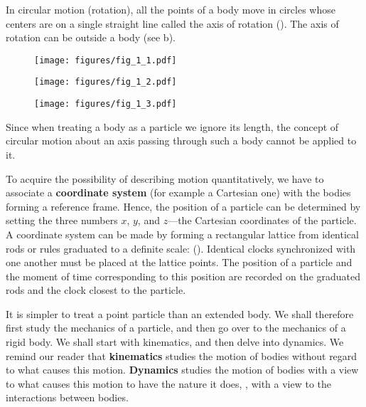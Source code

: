 In circular motion (rotation), all the points of a body move in circles whose centers are on a single straight line called the axis of rotation (). The axis of rotation can be outside a body (see b).

\begin{figure}[t]
	\begin{minipage}[t]{0.5\linewidth}
		\begin{center}
			\texttt{[image: figures/fig\_1\_1.pdf]}
			\caption[]{}
			\label{fig:1_1}
		\end{center}
	\end{minipage}
	\hfill{ }%
	\begin{minipage}[t]{0.5\linewidth}
		\begin{center}
			\texttt{[image: figures/fig\_1\_2.pdf]}
			\caption[]{}
			\label{fig:1_2}
		\end{center}
	\end{minipage}
\end{figure}

\begin{figure}[t]
	\begin{center}
		\texttt{[image: figures/fig\_1\_3.pdf]}
		\caption[]{}
		\label{fig:1_3}
	\end{center}
	\vspace{-0.8cm}
\end{figure}

Since when treating a body as a particle we ignore its length, the concept of circular motion about an axis passing through such a body cannot be applied to it.

To acquire the possibility of describing motion quantitatively, we have to associate a \textbf{coordinate system} (for example a Cartesian one) with the bodies forming a reference frame. Hence, the position of a particle can be determined by setting the three numbers $x$, $y$, and $z$---the Cartesian coordinates of the particle. A coordinate system can be made by forming a rectangular lattice from identical rods or rules graduated to a definite scale: (). Identical clocks synchronized with one another must be placed at the lattice points. The position of a particle and the moment of time corresponding to this position are recorded on the graduated rods and the clock closest to the particle.

It is simpler to treat a point particle than an extended body. We shall therefore first study the mechanics of a particle, and then go over to the mechanics of a rigid body. We shall start with kinematics, and then delve into dynamics. We remind our reader that \textbf{kinematics} studies the motion of bodies without regard to what causes this motion. \textbf{Dynamics} studies the motion of bodies with a view to what causes this motion to have the nature it does, \ie, with a view to the interactions between bodies.

